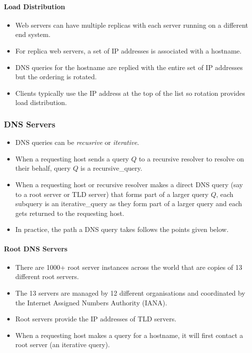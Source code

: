 \documentclass{article}
\begin{document}
\paragraph{Load Distribution}

\begin{itemize}
    \item Web servers can have multiple replicas with each server running on a different end system.
    \item For replica web servers, a set of IP addresses is associated with a hostname.
    \item DNS queries for the hostname are replied with the entire set of IP addresses but the ordering is rotated.
    \item Clients typically use the IP address at the top of the list so rotation provides load distribution.
\end{itemize}

\subsubsection{DNS Servers}

\begin{itemize}
    \item DNS queries can be \emph{recusrive} or \emph{iterative}.
    \item When a requesting host sends a query $Q$ to a recursive resolver to resolve on their behalf, query $Q$ is a \gls{recursive_query}.
    \item When a requesting host or recursive resolver makes a direct DNS query (say to a root server or TLD server) that forms part of a larger query $Q$, each subquery is an \gls{iterative_query} as they form part of a larger query and each gets returned to the requesting host.
    \item In practice, the path a DNS query takes follows the points given below.
\end{itemize}

\paragraph{Root DNS Servers}

\begin{itemize}
    \item There are 1000+ root server instances across the world that are copies of 13 different root servers.
    \item The 13 servers are managed by 12 different organisations and coordinated by the Internet Assigned Numbers Authority (IANA).
    \item Root servers provide the IP addresses of TLD servers.
    \item When a requesting host makes a query for a hostname, it will first contact a root server (an iterative query).
\end{itemize}
\end{document}
